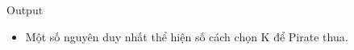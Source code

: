 Output  
\begin{itemize}
	\item     Một số nguyên duy nhất thể hiện số cách chọn K để Pirate thua.   
\end{itemize}